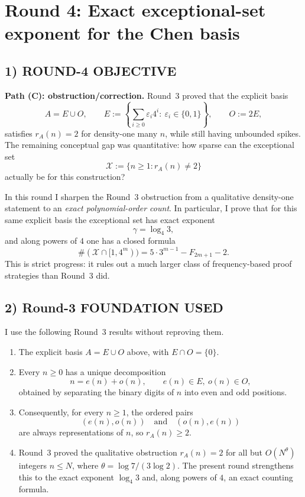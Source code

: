 \section{Round 4: Exact exceptional-set exponent for the Chen basis}

\subsection*{1) ROUND-4 OBJECTIVE}
\textbf{Path (C): obstruction/correction.} Round~3 proved that the explicit basis
\[
A=E\cup O,\qquad
E:=\left\{\sum_{i\ge 0}\varepsilon_i4^i:\ \varepsilon_i\in\{0,1\}\right\},\qquad
O:=2E,
\]
satisfies \(r_A(n)=2\) for density-one many \(n\), while still having unbounded spikes. The remaining conceptual gap was quantitative: how sparse can the exceptional set
\[
\mathcal X:=\{n\ge 1:r_A(n)\ne 2\}
\]
actually be for this construction?

In this round I sharpen the Round~3 obstruction from a qualitative density-one statement to an \emph{exact polynomial-order count}. In particular, I prove that for this same explicit basis the exceptional set has exact exponent
\[
\gamma=\log_4 3,
\]
and along powers of \(4\) one has a closed formula
\[
\#(\mathcal X\cap[1,4^m))=5\cdot 3^{m-1}-F_{2m+1}-2.
\]
This is strict progress: it rules out a much larger class of frequency-based proof strategies than Round~3 did.

\subsection*{2) Round-3 FOUNDATION USED}
I use the following Round~3 results without reproving them.
\begin{enumerate}
\item The explicit basis \(A=E\cup O\) above, with \(E\cap O=\{0\}\).
\item Every \(n\ge 0\) has a unique decomposition
\[
n=e(n)+o(n),\qquad e(n)\in E,\ o(n)\in O,
\]
obtained by separating the binary digits of \(n\) into even and odd positions.
\item Consequently, for every \(n\ge 1\), the ordered pairs
\[
(e(n),o(n))\quad\text{and}\quad(o(n),e(n))
\]
are always representations of \(n\), so \(r_A(n)\ge 2\).
\item Round~3 proved the qualitative obstruction \(r_A(n)=2\) for all but \(O(N^\theta)\) integers \(n\le N\), where \(\theta=\log 7/(3\log 2)\). The present round strengthens this to the exact exponent \(\log_4 3\) and, along powers of \(4\), an exact counting formula.
\end{enumerate}

